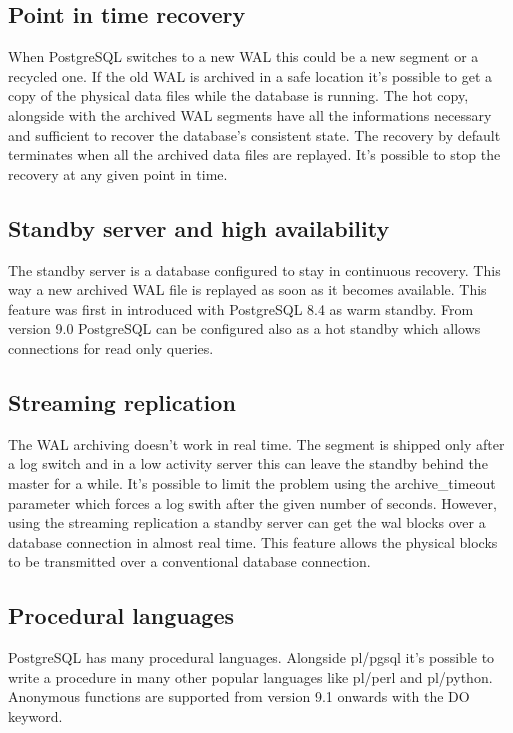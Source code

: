 \subsection{Point in time recovery}
When PostgreSQL switches to a new
WAL this could be a new segment or a recycled one. If the old WAL is archived in a safe
location it's possible to get a copy of the physical data files while the database is running.
The hot copy, alongside with the archived WAL segments have all the informations necessary and
sufficient to recover the database's consistent state. The recovery by default terminates when all
the archived data files are replayed. It's possible to stop the recovery at any given point in
time.

\subsection{Standby server and high availability}
The standby server is a database configured to
stay in continuous recovery. This way a new archived WAL file is replayed as soon as it becomes
available. This feature was first in introduced with  PostgreSQL 8.4 as warm standby. From version 9.0 PostgreSQL can be configured also as a hot standby
which allows connections for read only queries.

\subsection{Streaming replication}
The WAL archiving doesn't work in real time. The segment is shipped only after a log switch and
in a low activity server this can leave the standby behind the master for a while. It's  possible
to limit the problem using the archive\_timeout parameter which forces a log swith after the given
number of seconds. However, using the streaming replication a standby
server can get the wal blocks over a database connection in almost real time. This feature allows
the physical blocks to be transmitted over a conventional database connection.


\subsection{Procedural languages}
PostgreSQL has many procedural languages. Alongside pl/pgsql it's possible to write a
procedure in many other popular languages like pl/perl and pl/python. Anonymous functions are
supported from version 9.1 onwards with the DO keyword.

